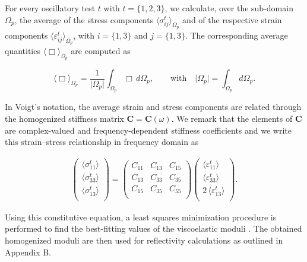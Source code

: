 \documentclass[draft]{agujournal2019}
\begin{document}
For every oscillatory test $t$ with $t = \{1,2,3\}$, we calculate, over the sub-domain $\Omega_p$, the average  of the stress components $\langle \sigma_{ij}^t \rangle_{\Omega_p}$ and of the respective strain components $\langle \varepsilon_{ij}^t \rangle_{\Omega_p}$, with $i=\{1,3\}$ and $j=\{1,3\}$. The corresponding average quantities $\langle \Box \rangle_{\Omega_p}$ are computed as
\begin{linenomath*}
\begin{equation}\label{Eq.12}
  \langle \Box \rangle_{\Omega_p} = \frac{1}{\vert \Omega_p \vert} \int_{\Omega_p} \Box \, d\Omega_p, \qquad \text{with} \quad  \vert \Omega_p \vert = \int_{\Omega_p}  d \Omega_p.
\end{equation}
\end{linenomath*}

In Voigt's notation, the average strain and stress components are related through the homogenized stiffness matrix $\bm{C} = \bm{C} (\omega) $. We remark that the elements of $\bm{C}$  are complex-valued and frequency-dependent stiffness coefficients and we write this strain--stress relationship in frequency domain as
\begin{linenomath*}
\begin{equation}\label{Eq.13}
 \begin{split}
 \begin{pmatrix}
 \langle \sigma_{11}^t\rangle \\
 \langle \sigma_{33}^t\rangle \\
  \langle\sigma_{13}^t\rangle \\
 \end{pmatrix}
 =
   \begin{pmatrix}
  C_{11} & C_{13} & C_{15} \\
  C_{13} & C_{33} & C_{35} \\
  C_{15} & C_{35} & C_{55}\\
 \end{pmatrix}
  \begin{pmatrix}
 \langle\varepsilon_{11}^t \rangle \\
 \langle \varepsilon_{33}^t \rangle \\
 2\, \langle \varepsilon_{13}^t \rangle \\
 \end{pmatrix}.
 \end{split}
\end{equation}
\end{linenomath*}
Using this constitutive equation, a least squares minimization procedure is performed to find the best-fitting values of the viscoelastic moduli \cite{Rubino2016}. The obtained homogenized moduli are then used for reflectivity calculations as outlined in Appendix B.
\end{document}
